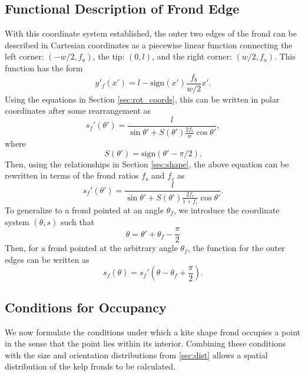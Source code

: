 \documentclass[ms,cpyr,lof,lot]{uathesis}
\newcommand{\sign}{\mbox{sign}}
\begin{document}
\subsection{Functional Description of Frond Edge}
With this coordinate system established, the outer two edges of the frond can be described in Cartesian coordinates as a piecewise linear function connecting the left corner: $(-w/2,f_a)$, the tip: $(0,l)$, and the right corner: $(w/2,f_a)$.
This function has the form
\begin{equation*}
	y'_f(x') = l-\sign(x')\frac{f_b}{w/2}x'.
\end{equation*}
Using the equations in Section \ref{sec:rot_coords}, this can be written in polar coordinates after some rearrangement as
\begin{equation*}
	s_f'(\theta') = \frac{l}{\sin\theta' + S(\theta')\frac{2f_b}{w}\cos\theta'},
\end{equation*}
where
\begin{equation*}
	S(\theta') = \sign(\theta'-\pi/2).
\end{equation*}
Then, using the relationships in Section \ref{sec:shape}, the above equation can be rewritten in terms of the frond ratios $f_s$ and $f_r$ as
\begin{equation*}
	\label{eq:rf_rel}
	s_f'(\theta') = \frac{l}{\sin\theta' + S(\theta')\frac{2f_r}{1+f_s}\cos\theta'}.
\end{equation*}
To generalize to a frond pointed at an angle $\theta_f$, we introduce the coordinate system $(\theta,s)$ such that
\begin{equation*}
	\theta = \theta' + \theta_f - \frac{\pi}{2}
\end{equation*}
Then, for a frond pointed at the arbitrary angle $\theta_f$, the function for the outer edges can be written as 
\begin{equation*}
	\label{eq:rf_abs}
	s_f(\theta) = s_f'\left(\theta - \theta_f + \frac{\pi}{2} \right).
\end{equation*}

\subsection{Conditions for Occupancy}
We now formulate the conditions under which a kite shape frond occupies a point
in the sense that the point lies within its interior.
Combining these conditions with the size and orientation distributions from \ref{sec:dist}
allows a spatial distribution of the kelp fronds to be calculated.
\end{document}
